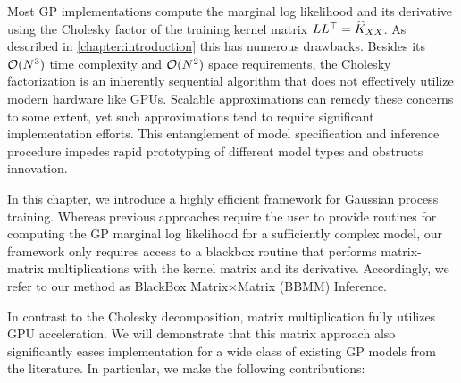 Most GP implementations compute the marginal log likelihood and its derivative using the Cholesky factor of the training kernel matrix $L L^\top = \widehat{K}_{XX}$.
As described in \cref{chapter:introduction} this has numerous drawbacks.
Besides its $\bigo{N^3}$ time complexity and $\bigo{N^2}$ space requirements, the Cholesky factorization is an inherently sequential algorithm that does not effectively utilize modern hardware like GPUs.
Scalable approximations can remedy these concerns to some extent, yet such approximations tend to require significant implementation efforts.
This entanglement of model specification and inference procedure impedes rapid prototyping of different model types and obstructs innovation.

In this chapter, we introduce a highly efficient framework for Gaussian process training.
Whereas previous approaches require the user to provide routines for computing the GP marginal log likelihood for a sufficiently complex model,
our framework only requires access to a blackbox routine that performs matrix-matrix multiplications with the kernel matrix and its derivative.
Accordingly, we refer to our method as BlackBox Matrix$\times$Matrix (BBMM) Inference.

In contrast to the Cholesky decomposition, matrix multiplication fully utilizes GPU acceleration.
We will demonstrate that this matrix approach also significantly eases implementation for a wide class of existing GP models from the literature.
In particular, we make the following contributions:

